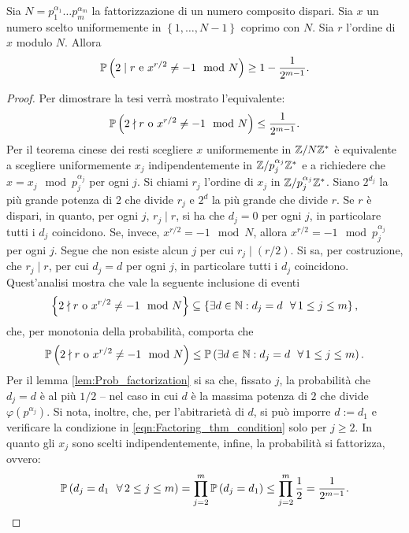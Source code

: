 \begin{thm}
 Sia $N = p_1^{\alpha_1} \dots p_m^{\alpha_m}$ la fattorizzazione di un numero composito dispari. 
 Sia $x$ un numero scelto uniformemente in $\left\{1,\dots,N-1\right\}$ coprimo con $N$. 
 Sia  $r$ l'ordine di $x$ modulo $N$.
 Allora
 \begin{equation}
  \P\left( 2 \mid r \text{ e } x^{r/2} \neq -1 \mod N \right) \geq 1 - \frac{1}{2^{m-1}}.
 \end{equation}
\end{thm}
\begin{proof}
 Per dimostrare la tesi verrà mostrato l'equivalente:
 \begin{equation}
  \P\left( 2 \nmid r \text{ o } x^{r/2} \neq -1 \mod N \right) \leq \frac{1}{2^{m-1}}.
 \end{equation}
 Per il teorema cinese dei resti scegliere $x$ uniformemente in $\Zn{N}^*$ è equivalente a scegliere uniformemente $x_j$ indipendentemente in $\Zn{p_j^{\alpha_j}}^*$ e a richiedere che $x = x_j \mod p_j^{\alpha_j}$ per ogni $j$.
 Si chiami $r_j$ l'ordine di $x_j$ in $\Zn{p_j^{\alpha_j}}^*$.
 Siano $2^{d_j}$ la più grande potenza di 2 che divide $r_j$ e $2^d$ la più grande che divide $r$.
 Se $r$ è dispari, in quanto, per ogni $j$, $r_j \mid r$, si ha che $d_j = 0$ per ogni $j$, in particolare tutti i $d_j$ coincidono.
 Se, invece, $x^{r/2} = -1 \mod N$, allora $x^{r/2} = -1 \mod p_j^{\alpha_j}$ per ogni $j$.
 Segue che non esiste alcun $j$ per cui $r_j \mid (r/2)$.
 Si sa, per costruzione, che $r_j \mid r$, per cui $d_j = d$ per ogni $j$, in particolare tutti i $d_j$ coincidono.
 Quest'analisi mostra che vale la seguente inclusione di eventi
 \begin{equation}\label{eqn:Factoring_thm_condition}
  \left\{2 \nmid r \text{ o } x^{r/2} \neq -1 \mod N\right\} \subseteq \left\{\exists d \in \N : d_j = d\ \ \forall\, 1 \leq j \leq m \right\},
 \end{equation}
 che, per monotonia della probabilità, comporta che
 \begin{equation}
  \P\left( 2 \nmid r \text{ o } x^{r/2} \neq -1 \mod N \right) \leq \P\left( \exists d \in \N : d_j = d\ \ \forall\, 1 \leq j \leq m \right).
 \end{equation}
 Per il lemma \ref{lem:Prob_factorization} si sa che, fissato $j$, la probabilità che $d_j = d$ è al più $1/2$ -- nel caso in cui $d$ è la massima potenza di $2$ che divide $\varphi\left(p^{\alpha_j}\right)$.
 Si nota, inoltre, che, per l'abitrarietà di $d$, si può imporre $d:=d_1$ e verificare la condizione in \eqref{eqn:Factoring_thm_condition} solo per $j \geq 2$.
 In quanto gli $x_j$ sono scelti indipendentemente, infine, la probabilità si fattorizza, ovvero:
 \begin{equation}
  \P\left(d_j = d_1\ \ \forall\, 2 \leq j \leq m \right) = \prod_{j=2}^m \P\left(d_j = d_1 \right) \leq \prod_{j=2}^m \frac{1}{2} = \frac{1}{2^{m-1}}.
 \end{equation}
\end{proof}
